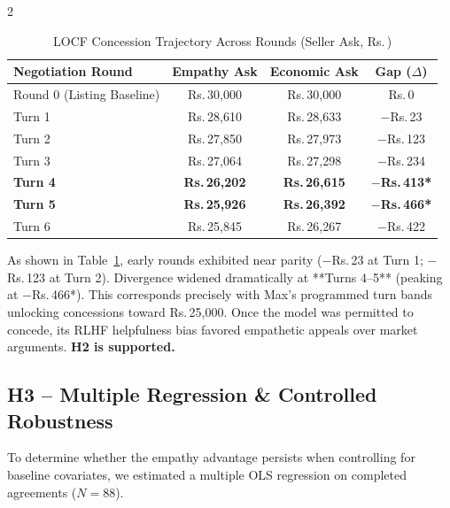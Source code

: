 \documentclass[10pt,a4paper]{article}
\newcommand{\rs}{\textsf{Rs.\,}}
\begin{document}
\begin{multicols}{2}
\begin{table}[H]
\centering
\scriptsize
\caption{LOCF Concession Trajectory Across Rounds (Seller Ask, \rs)}
\label{tab:locf}
\setlength{\tabcolsep}{5pt}
\renewcommand{\arraystretch}{1.15}
\begin{tabular}{@{}lccc@{}}
\toprule
\textbf{Negotiation Round} & \textbf{Empathy Ask} & \textbf{Economic Ask} & \textbf{Gap ($\Delta$)} \\
\midrule
Round 0 (Listing Baseline) & \rs30,000            & \rs30,000             & \rs0 \\
Turn 1                     & \rs28,610            & \rs28,633             & $-$\rs23 \\
Turn 2                     & \rs27,850            & \rs27,973             & $-$\rs123 \\
Turn 3                     & \rs27,064            & \rs27,298             & $-$\rs234 \\
\textbf{Turn 4}            & \textbf{\rs26,202}   & \textbf{\rs26,615}    & $\mathbf{-}$\textbf{\rs413*} \\
\textbf{Turn 5}            & \textbf{\rs25,926}   & \textbf{\rs26,392}    & $\mathbf{-}$\textbf{\rs466*} \\
Turn 6                     & \rs25,845            & \rs26,267             & $-$\rs422 \\
\bottomrule
\end{tabular}
\end{table}

As shown in Table~\ref{tab:locf}, early rounds exhibited near parity ($-$\rs23 at Turn 1; $-$\rs123 at Turn 2). Divergence widened dramatically at **Turns 4--5** (peaking at $-$\rs466*). This corresponds precisely with Max's programmed turn bands unlocking concessions toward \rs25,000. Once the model was permitted to concede, its RLHF helpfulness bias favored empathetic appeals over market arguments. \textbf{H2 is supported.}

\subsection{H3 -- Multiple Regression \& Controlled Robustness}

To determine whether the empathy advantage persists when controlling for baseline covariates, we estimated a multiple OLS regression on completed agreements ($N = 88$).


\end{multicols}
\end{document}
